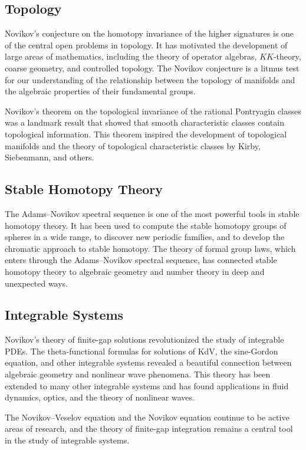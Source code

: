 \subsection{Topology}

Novikov's conjecture on the homotopy invariance of the higher signatures is one of the central open problems in topology. It has motivated the development of large areas of mathematics, including the theory of operator algebras, \(KK\)-theory, coarse geometry, and controlled topology. The Novikov conjecture is a litmus test for our understanding of the relationship between the topology of manifolds and the algebraic properties of their fundamental groups.

Novikov's theorem on the topological invariance of the rational Pontryagin classes was a landmark result that showed that smooth characteristic classes contain topological information. This theorem inspired the development of topological manifolds and the theory of topological characteristic classes by Kirby, Siebenmann, and others.

\subsection{Stable Homotopy Theory}

The Adams--Novikov spectral sequence is one of the most powerful tools in stable homotopy theory. It has been used to compute the stable homotopy groups of spheres in a wide range, to discover new periodic families, and to develop the chromatic approach to stable homotopy. The theory of formal group laws, which enters through the Adams--Novikov spectral sequence, has connected stable homotopy theory to algebraic geometry and number theory in deep and unexpected ways.

\subsection{Integrable Systems}

Novikov's theory of finite-gap solutions revolutionized the study of integrable PDEs. The theta-functional formulas for solutions of KdV, the sine-Gordon equation, and other integrable systems revealed a beautiful connection between algebraic geometry and nonlinear wave phenomena. This theory has been extended to many other integrable systems and has found applications in fluid dynamics, optics, and the theory of nonlinear waves.

The Novikov--Veselov equation and the Novikov equation continue to be active areas of research, and the theory of finite-gap integration remains a central tool in the study of integrable systems.

